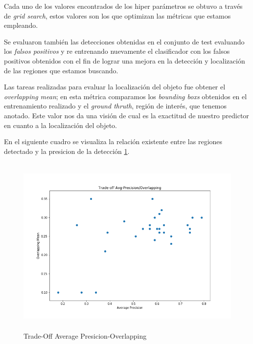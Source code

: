 Cada uno de los valores encontrados de los hiper parámetros se obtuvo a través de \textit{grid search}, estos valores son los que optimizan las métricas que estamos empleando.

Se evaluaron también las detecciones obtenidas en el conjunto de test evaluando los \textit{falsos positivos} y re entrenando nuevamente el clasificador con los falsos positivos obtenidos con el fin de lograr una mejora en la detección y localización de las regiones que estamos buscando.

Las tareas realizadas para evaluar la localización del objeto fue obtener el \textit{overlapping mean}; en esta métrica comparamos los \textit{bounding boxs} obtenidos en el entrenamiento realizado y el \textit{ground thruth}, región de interés, que tenemos anotado. Este valor nos da una visión de cual es la exactitud de nuestro predictor en cuanto a la localización del objeto.

En el siguiente cuadro se visualiza la relación existente entre las regiones detectado y la presicion de la detección \ref{Fig: trade-off}.


\begin{figure}[H]
 \centering
  \includegraphics[height=9cm,keepaspectratio=true,clip=true]{imagenes/Evaluacion-exp/presicion-over.png}
  \caption{Trade-Off Average Presicion-Overlapping}
	\label{Fig: trade-off}
\end{figure}


